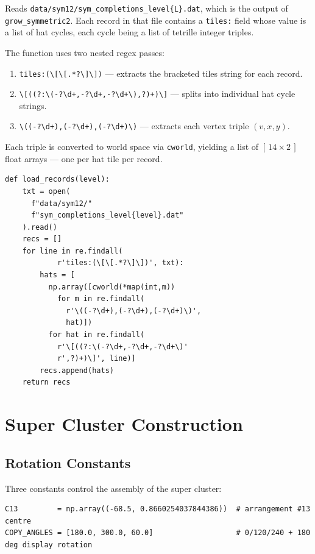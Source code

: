 \documentclass[10pt,a4paper]{article}
\let\polysection\section
\renewcommand\section{\needspace{0.16\textheight}\polysection}
\let\polysubsection\subsection
\renewcommand\subsection{\needspace{0.12\textheight}\polysubsection}
\newcommand{\code}[1]{\texttt{\small #1}}
\newcommand{\file}[1]{\texttt{\footnotesize #1}}
\begin{document}
\begin{tcolorbox}[dualbox, title={\code{load\_records(level)} — parse .dat completion files}]
  Reads \file{data/sym12/sym\_completions\_level\{L\}.dat}, which is
  the output of \code{grow\_symmetric2}.  Each record in that file contains
  a \texttt{tiles:} field whose value is a list of hat cycles, each cycle
  being a list of tetrille integer triples.

  The function uses two nested regex passes:
  \begin{enumerate}
    \item \verb|tiles:(\[\[.*?\]\])| — extracts the bracketed tiles string for
      each record.
    \item \verb|\[((?:\(-?\d+,-?\d+,-?\d+\),?)+)\]| — splits into individual
      hat cycle strings.
    \item \verb|\((-?\d+),(-?\d+),(-?\d+)\)| — extracts each vertex triple
      $(v, x, y)$.
  \end{enumerate}
  Each triple is converted to world space via \code{cworld}, yielding a list
  of $[\,14\times 2\,]$ float arrays — one per hat tile per record.
\tcblower
\begin{verbatim}
def load_records(level):
    txt = open(
      f"data/sym12/"
      f"sym_completions_level{level}.dat"
    ).read()
    recs = []
    for line in re.findall(
            r'tiles:(\[\[.*?\]\])', txt):
        hats = [
          np.array([cworld(*map(int,m))
            for m in re.findall(
              r'\((-?\d+),(-?\d+),(-?\d+)\)',
              hat)])
          for hat in re.findall(
            r'\[((?:\(-?\d+,-?\d+,-?\d+\)'
            r',?)+)\]', line)]
        recs.append(hats)
    return recs
\end{verbatim}
\end{tcolorbox}

\section{Super Cluster Construction}

\subsection{Rotation Constants}

Three constants control the assembly of the super cluster:

\begin{verbatim}
C13         = np.array((-68.5, 0.8660254037844386))  # arrangement #13 centre
COPY_ANGLES = [180.0, 300.0, 60.0]                   # 0/120/240 + 180 deg display rotation
\end{verbatim}
\end{document}
